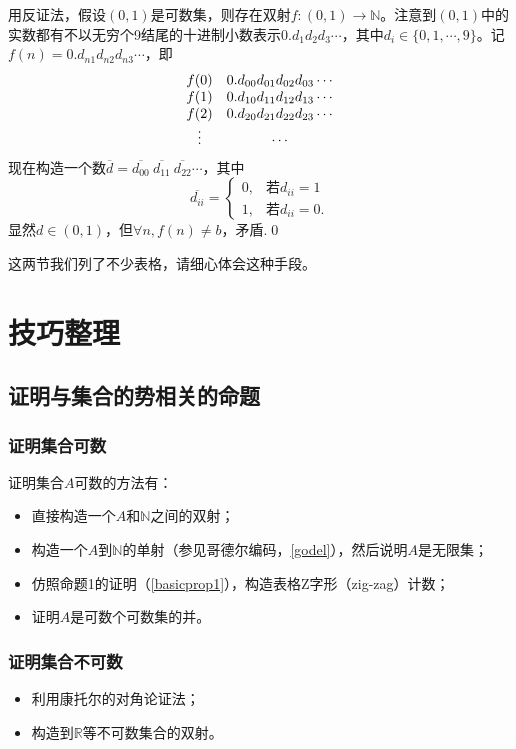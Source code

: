 \documentclass[b5paper,oneside]{ctexbook}
\begin{document}
用反证法，假设$(0,1)$是可数集，则存在双射$f:(0,1)\to\mathbb{N}$。注意到$(0,1)$中的实数都有不以无穷个9结尾的十进制小数表示$0.d_1d_2d_3\cdots$，其中$d_i\in\{0,1,\cdots ,9\}$。记$f(n)=0.d_{n1}d_{n2}d_{n3}\cdots$，即
\[\begin{array} {*{4}c} 
f(0) & 0.d_{00}d_{01}d_{02}d_{03}\cdots
\\f(1) & 0.d_{10}d_{11}d_{12}d_{13}\cdots
\\f(2) & 0.d_{20}d_{21}d_{22}d_{23}\cdots
\\\vdots & \cdots
\end{array}\]
现在构造一个数$\overline{d}=\overline{d_{00}}\ \overline{d_{11}}\ \overline{d_{22}}\cdots$，其中
\[\overline{d_{ii}}=\begin{cases}
0,&\text{若}d_{ii}=1
\\1,&\text{若}d_{ii}=0.\end{cases}\]
显然$d\in (0,1)$，但$\forall n,f(n)\neq b$，矛盾.\hfill\qed

这两节我们列了不少表格，请细心体会这种手段。
\section{技巧整理}
\subsection{证明与集合的势相关的命题}
\subsubsection{证明集合可数}
证明集合$A$可数的方法有：
\begin{itemize}
\item 直接构造一个$A$和$\mathbb{N}$之间的双射；
\item 构造一个$A$到$\mathbb{N}$的单射（参见哥德尔编码，\ref{godel}），然后说明$A$是无限集；
\item 仿照命题1的证明（\ref{basicprop1}），构造表格Z字形（zig-zag）计数；
\item 证明$A$是可数个可数集的并。
\end{itemize}
\subsubsection{证明集合不可数}
\begin{itemize}
\item 利用康托尔的对角论证法；
\item 构造到$\mathbb{R}$等不可数集合的双射。
\end{itemize}
\end{document}
